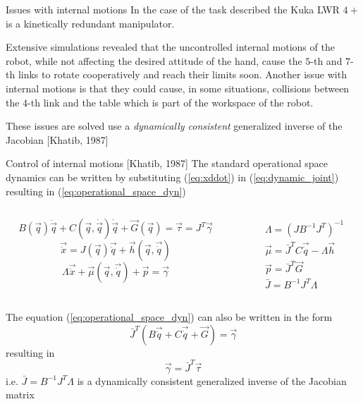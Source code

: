\begin{frame}{Issues with internal motions}
  In the case of the task described the Kuka LWR $4+$ is a kinetically redundant manipulator.
  \par
  Extensive simulations revealed
  that the uncontrolled internal motions of the robot, while not affecting the
  desired attitude of the hand, cause the $5$-th and $7$-th links to rotate
  cooperatively and reach their limits soon. Another issue with internal motions
  is that they could cause, in some situations, collisions between the $4$-th
  link and the table which is part of the workspace of the robot.
  \par
  These issues are solved use a \emph{dynamically consistent} generalized inverse of the Jacobian [Khatib, 1987]
\end{frame}
  
\begin{frame}{Control of internal motions [Khatib, 1987]}
  The standard operational space dynamics can be written by substituting
  (\ref{eq:xddot}) in (\ref{eq:dynamic_joint}) resulting in (\ref{eq:operational_space_dyn})
  \begin{columns}
    \begin{column}{0.7\columnwidth}
      \begin{equation}\label{eq:dynamic_joint}
      B(\vec{q}) \ddot{\vec{q}} + C(\vec{q}, \dot{\vec{q}}) \dot{\vec{q}} + \vec{G}(\vec{q}) = \vec{\tau} = J^{T} \vec{\gamma}
      \end{equation}
      \begin{equation}\label{eq:xddot}
        \vec{\ddot{x}} = J(\vec{q}) \vec{\ddot{q}} + \vec{h}(\vec{q},\vec{\dot{q}})
      \end{equation}
      \begin{equation}\label{eq:operational_space_dyn}
        \Lambda \vec{\ddot{x}} + \vec{\mu}(\vec{q}, \vec{\dot{q}}) + \vec{p} = \vec{\gamma}
      \end{equation}
    \end{column}
    \begin{column}{0.4\columnwidth}
      \[
      \begin{split}
        &\Lambda = (J B^{-1} J^{T})^{-1}\\
        &\vec{\mu} = \bar{J}^{T} C \vec{\dot{q}} - \Lambda \vec{h}\\
        &\vec{p} = \bar{J}^T \vec{G}\\
        &\bar{J} = B^{-1} J^{T} \Lambda
      \end{split}
      \]
    \end{column}
  \end{columns}
The equation (\ref{eq:operational_space_dyn}) can also be written in the form
\[
\bar{J}^{T} (B \vec{\ddot{q}} + C \vec{\dot{q}} + \vec{G}) = \vec{\gamma}
\]
resulting in 
\[
\vec{\gamma} = \bar{J}^{T} \vec{\tau}
\]
i.e. $\bar{J} = B^{-1} J^{T} \Lambda$ is a dynamically consistent generalized inverse of the Jacobian matrix
\end{frame}

